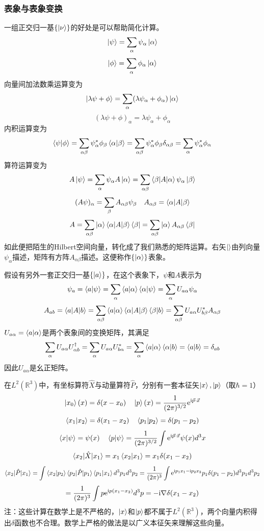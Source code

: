 \subsubsection{表象与表象变换}

一组正交归一基$\{\ket{\nu}\}$的好处是可以帮助简化计算。
$$\ket{\psi}=\sum_\alpha\psi_\alpha\ket{\alpha}$$
$$\ket{\phi}=\sum_\alpha\phi_\alpha\ket{\alpha}$$
向量间加法数乘运算变为
$$\ket{\lambda\psi+\phi}=\sum_\alpha(\lambda\psi_\alpha+\phi_\alpha)\ket{\alpha}$$
$$(\lambda\psi+\phi)_\alpha=\lambda\psi_\alpha+\phi_\alpha$$
内积运算变为
$$\braket{\psi|\phi}=\sum_{\alpha\beta}\psi^*_\alpha\phi_\beta\braket{\alpha|\beta}=\sum_{\alpha\beta}\psi^*_\alpha\phi_\beta\delta_{\alpha\beta}=\sum_\alpha\psi^*_\alpha\phi_\alpha$$
算符运算变为
$$A\ket{\psi}=\sum_\alpha \psi_\alpha A\ket{\alpha}=\sum_{\alpha\beta}\braket{\beta|A|\alpha}\psi_\alpha\ket{\beta}$$
$$(A\psi)_\alpha=\sum_\beta A_{\alpha\beta}\psi_\beta\quad A_{\alpha\beta}=\braket{\alpha|A|\beta}$$
$$A=\sum_{\alpha\beta}\ket{\alpha}\braket{\alpha|A|\beta}\bra{\beta}=\sum_{\alpha\beta}\ket{\alpha}A_{\alpha\beta}\bra{\beta}$$
如此便把陌生的Hilbert空间向量，转化成了我们熟悉的矩阵运算。右矢$\ket{}$由列向量$\psi_\alpha$描述，矩阵有方阵$A_{\alpha\beta}$描述。这便称作$\{\ket{\alpha}\}$表象。

假设有另外一套正交归一基$\{\ket{a}\}$，在这个表象下，$\psi$和$A$表示为
$$\psi_a=\braket{a|\psi}=\sum_\alpha\braket{a|\alpha}\braket{\alpha|\psi}=\sum_\alpha U_{a\alpha}\psi_\alpha$$
$$A_{ab}=\braket{a|A|b}=\sum_{\alpha\beta}\braket{a|\alpha}\braket{\alpha|A|\beta}\braket{\beta|b}=\sum_{\alpha\beta}U_{a\alpha}U_{b\beta}^*A_{\alpha\beta}$$
$U_{a\alpha}=\braket{a|\alpha}$是两个表象间的变换矩阵，其满足
$$\sum_{\alpha}U_{a\alpha}U^\dagger_{\alpha b}=\sum_{\alpha}U_{a\alpha}U^*_{b\alpha}=\sum_{\alpha}\braket{a|\alpha}\braket{\alpha|b}=\braket{a|b}=\delta_{ab}$$
因此$U_{a\alpha}$是幺正矩阵。
\begin{example}
    在$L^2(\mathbb{R}^3)$中，有坐标算符$\hat{X}$与动量算符$\hat{P}$，分别有一套本征矢$\ket{x},\ket{p}$（取$\hbar=1$）
    $$\ket{x_0}(x)=\delta(x-x_0)\quad \ket{p}(x)=\frac{1}{(2\pi)^{3/2}}\mathrm{e}^{\mathrm{i} \vec{p}\cdot\vec{x}}$$
    $$\braket{x_1|x_2}=\delta(x_1-x_2)\quad \braket{p_1|p_2}=\delta(p_1-p_2)$$
    $$\braket{x|\psi}=\psi(x)\quad \braket{p|\psi}=\frac{1}{(2\pi)^{3/2}}\int \mathrm{e}^{\mathrm{i} \vec{p}\cdot\vec{x}}\psi(x)d^3x$$
    $$\braket{x_2|\hat{X}|x_1}=x_1\braket{x_2|x_1}=x_1\delta(x_1-x_2)$$
    $$\braket{x_2|\hat{P}|x_1}=\int\braket{x_2|p_2}\braket{p_2|\hat{P}|p_1}\braket{p_1|x_1}d^3p_1d^3p_2=\frac{1}{(2\pi)^{3}}\int \mathrm{e}^{\mathrm{i} p_1x_1-\mathrm{i} p_2x_2}p_1\delta(p_1-p_2)d^3p_1d^3p_2$$
    $$=\frac{1}{(2\pi)^3}\int p\mathrm{e}^{\mathrm{i} p(x_1-x_2)}d^3p=-\mathrm{i}\nabla\delta(x_1-x_2)$$
    注：这些计算在数学上是不严格的，$\ket{x}$和$\ket{p}$都不属于$L^2(\mathbb{R}^3)$，两个向量内积得出$\delta$函数也不合理。数学上严格的做法是以广义本征矢来理解这些向量。

\end{example}

